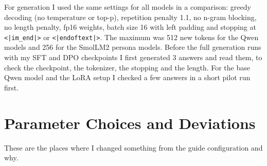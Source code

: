 \documentclass[11pt,a4paper]{article}
\begin{document}
For generation I used the same settings for all models in a comparison: greedy decoding (no temperature or top-p), repetition penalty 1.1,
no n-gram blocking, no length penalty, fp16 weights, batch size 16 with left padding and stopping at \texttt{<|im\_end|>} or
\texttt{<|endoftext|>}. The maximum was 512 new tokens for the Qwen models and 256 for the SmolLM2 persona models. Before the full generation runs with my SFT and DPO checkpoints I first generated 3 answers and read them, to check the checkpoint, the tokenizer, the stopping and the length. For the base Qwen model and the LoRA setup I checked a few answers in a short pilot run first.

\section{Parameter Choices and Deviations}

These are the places where I changed something from the guide configuration and why.
\end{document}
